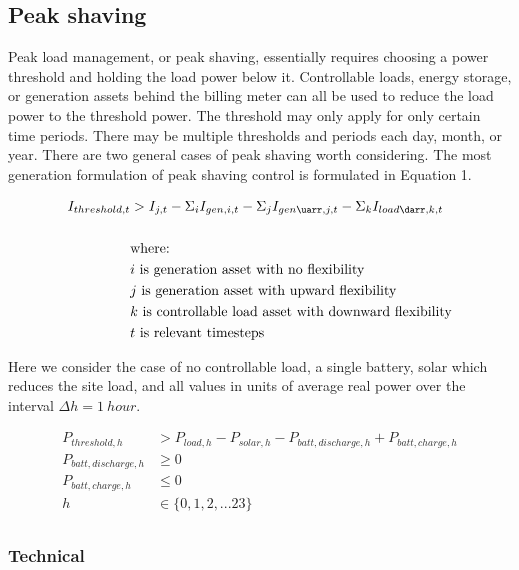 \documentclass[
]{article}
\begin{document}
\hypertarget{peak-shaving}{%
\subsection{Peak shaving}\label{peak-shaving}}

Peak load management, or peak shaving, essentially requires choosing a
power threshold and holding the load power below it. Controllable loads,
energy storage, or generation assets behind the billing meter can all be
used to reduce the load power to the threshold power. The threshold may
only apply for only certain time periods. There may be multiple
thresholds and periods each day, month, or year. There are two general
cases of peak shaving worth considering. The most generation formulation
of peak shaving control is formulated in Equation 1.

\begin{equation}
\begin{split}
I_{threshold,t} &> I_{j,t} - \Sigma_i I_{gen,i,t} - \Sigma_j I_{gen\uarr,j,t} - \Sigma_k I_{load\darr,k,t}  \\
\\
&\text{where:} \\
&i\text{ is generation asset with no flexibility} \\
&j\text{ is generation asset with upward flexibility} \\
&k\text{ is controllable load asset with downward flexibility} \\
&t\text{ is relevant timesteps}
\end{split}
\end{equation}

Here we consider the case of no controllable load, a single battery,
solar which reduces the site load, and all values in units of average
real power over the interval \(\Delta h = 1\ hour\).

\begin{equation}
\begin{split}
P_{threshold,h} &> P_{load,h} - P_{solar,h} - P_{batt,discharge,h} + P_{batt,charge,h}   \\
P_{batt,discharge,h} &\ge 0 \\
P_{batt,charge,h} &\le 0 \\
h &\in \{0,1,2,...23\} \\
\end{split}
\end{equation}

\hypertarget{technical}{%
\subsubsection{Technical}\label{technical}}
\end{document}
